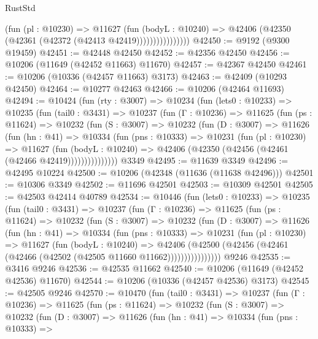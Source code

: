 \begin{lexlean}{RustStd}
\begin{coremodule}
                        (fun (pl : @10230) =>
                        @11627
                          (fun (bodyL : @10240) =>
                          @42406 (@42350 (@42361 (@42372 (@42413 @42419))))))))))))))))
@42450 := @9192 (@9300 @19459)
@42451 := @42448 @42450
@42452 := @42356 @42450
@42456 := @10206 (@11649 (@42452 @11663) @11670)
@42457 := @42367 @42450
@42461 := @10206 (@10336 (@42457 @11663) @3173)
@42463 := @42409 (@10293 @42450)
@42464 := @10277 @42463
@42466 := @10206 (@42464 @11693)
@42494 := @10424
    (fun (rty : @3007) =>
    @10234
      (fun (lets0 : @10233) =>
      @10235
        (fun (tail0 : @3431) =>
        @10237
          (fun (Γ : @10236) =>
          @11625
            (fun (ps : @11624) =>
            @10232
              (fun (S : @3007) =>
              @10232
                (fun (D : @3007) =>
                @11626
                  (fun (hn : @41) =>
                  @10334
                    (fun (pns : @10333) =>
                    @10231
                      (fun (pl : @10230) =>
                      @11627
                        (fun (bodyL : @10240) =>
                        @42406 (@42350 (@42456 (@42461 (@42466 @42419)))))))))))))))
    @3349
@42495 := @11639 @3349
@42496 := @42495 @10224
@42500 := @10206 (@42348 (@11636 (@11638 @42496)))
@42501 := @10306 @3349
@42502 := @11696 @42501
@42503 := @10309 @42501
@42505 := @42503 @42414 @40789
@42534 := @10446
    (fun (lets0 : @10233) =>
    @10235
      (fun (tail0 : @3431) =>
      @10237
        (fun (Γ : @10236) =>
        @11625
          (fun (ps : @11624) =>
          @10232
            (fun (S : @3007) =>
            @10232
              (fun (D : @3007) =>
              @11626
                (fun (hn : @41) =>
                @10334
                  (fun (pns : @10333) =>
                  @10231
                    (fun (pl : @10230) =>
                    @11627
                      (fun (bodyL : @10240) =>
                      @42406
                        (@42500
                          (@42456 (@42461 (@42466 (@42502 (@42505 @11660 @11662))))))))))))))))
    @9246
@42535 := @3416 @9246
@42536 := @42535 @11662
@42540 := @10206 (@11649 (@42452 @42536) @11670)
@42544 := @10206 (@10336 (@42457 @42536) @3173)
@42545 := @42505 @9246
@42570 := @10470
    (fun (tail0 : @3431) =>
    @10237
      (fun (Γ : @10236) =>
      @11625
        (fun (ps : @11624) =>
        @10232
          (fun (S : @3007) =>
          @10232
            (fun (D : @3007) =>
            @11626
              (fun (hn : @41) =>
              @10334
                (fun (pns : @10333) =>

\end{coremodule}
\end{lexlean}
